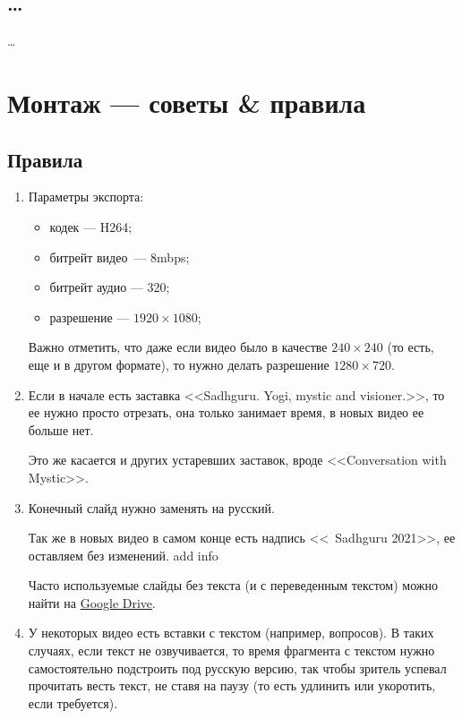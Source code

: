 \documentclass[
a4paper, %
12pt, %
article,
onecolumn, %
openany, %
]{memoir}
\begin{document}
\subsection{\ldots}
\ldots

\section{Монтаж --- советы \& правила}\label{montageRules}
\subsection{Правила}
\begin{enumerate}
\item Параметры экспорта:
    \begin{itemize}
    \item кодек --- H264;
    \item битрейт видео~--- 8mbps;
    \item битрейт аудио --- 320;
    \item разрешение --- $1920 \times 1080$;
    \end{itemize}

    Важно отметить, что даже если видео было в качестве $240 \times 240$ (то есть, еще и в другом формате), то нужно делать разрешение $1280 \times 720$.
\item Если в начале есть заставка <<Sadhguru. Yogi, mystic and visioner.>>, то ее нужно просто отрезать, она только занимает время, в новых видео ее больше нет. 

    Это же касается и других устаревших заставок, вроде <<Conversation with Mystic>>.
\item Конечный слайд нужно заменять на русский. 

    Так же в новых видео в самом конце есть надпись <<\textcopyright\ Sadhguru 2021>>, ее оставляем без изменений. {\color{red} add info}

 Часто используемые слайды без текста (и с переведенным текстом) можно найти на \href{https://drive.google.com/drive/folders/1moOa4wR201aplGnueFKTXclzGQBKhxzc?usp=sharing}{Google Drive}.

\item У некоторых видео есть вставки с текстом (например, вопросов). В таких случаях, если текст не озвучивается, то время фрагмента с текстом нужно самостоятельно подстроить под русскую версию, так чтобы зритель успевал прочитать весть текст, не ставя на паузу (то есть удлинить или укоротить, если требуется).  


\end{enumerate}
\end{document}
